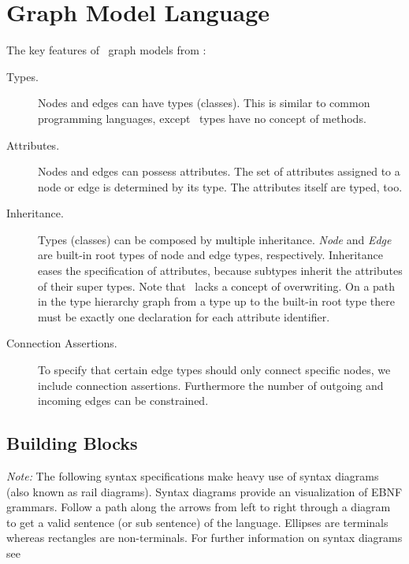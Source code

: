 \chapter{Graph Model Language}
The key features of \GrG\ graph models from \cite{geiss}:

\begin{description}
\item[Types.] Nodes and edges can have types (classes). This is similar to common programming languages, except \GrG\ types have no concept of methods. 
\item[Attributes.] Nodes and edges can possess attributes. The set of attributes assigned to a node or edge is determined by its type. The attributes itself are typed, too.
\item[Inheritance.] Types (classes) can be composed by multiple inheritance. \emph{Node} and \emph{Edge} are built-in root types of node and edge types, respectively. Inheritance eases the specification of attributes, because subtypes inherit the attributes of their super types. Note that \GrG\ lacks a concept of overwriting. On a path in the type hierarchy graph from a type up to the built-in root type there must be exactly one declaration for each attribute identifier.
\item[Connection Assertions.] To specify that certain edge types should only connect specific nodes, we include connection assertions. Furthermore the number of outgoing and incoming edges can be constrained.
\end{description}

\section{Building Blocks}
\label{modelbb}

\emph{Note:} The following syntax specifications make heavy use of syntax diagrams (also known as rail diagrams). Syntax diagrams provide an visualization of EBNF grammars. Follow a path along the arrows from left to right through a diagram to get a valid sentence (or sub sentence) of the language. Ellipses are terminals whereas rectangles are non-terminals. For further information on syntax diagrams see \cite{XXX}

